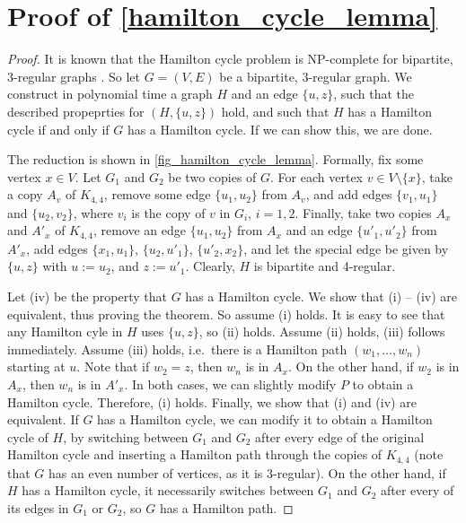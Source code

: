 \documentclass[runningheads]{llncs}
\numberwithin{equation}{section}
\newcommand{\set}[1]{\{ #1 \}}
\begin{document}
\section{Proof of \cref{hamilton_cycle_lemma}}

\label{appendix:hamilton_prime}
\hamiltonPrime*

\begin{proof}
It is known that the Hamilton cycle problem is NP-complete for bipartite, 3-regular graphs \cite{hamilton3regularBip}. So let $G = (V, E)$ be a bipartite, 3-regular graph. We construct in polynomial time a graph $H$ and an edge $\set{u,z}$, such that the described propeprties for $(H, \set{u,z})$ hold, and such that $H$ has a Hamilton cycle if and only if $G$ has a Hamilton cycle. If we can show this, we are done.

The reduction is shown in \cref{fig_hamilton_cycle_lemma}. Formally, fix some vertex $x \in V$. Let $G_1$ and $G_2$ be two copies of $G$. For each vertex $v \in V \setminus \set{x}$, take a copy $A_v$ of $K_{4,4}$, remove some edge $\set{u_1, u_2}$ from $A_v$, and add edges $\set{v_1,u_1}$ and $\set{u_2,v_2}$, where $v_i$ is the copy of $v$ in $G_i$, $i = 1,2$. Finally, take two copies $A_x$ and $A'_x$ of $K_{4,4}$, remove an edge $\set{u_1,u_2}$ from $A_x$ and an edge $\set{u'_1,u'_2}$ from $A'_x$, add edges $\set{x_1,u_1}$, $\set{u_2,u'_1}$, $\set{u'_2,x_2}$, and let the special edge be given by $\set{u, z}$ with $u := u_2$, and $z := u'_1$. Clearly, $H$ is bipartite and 4-regular.

Let (iv) be the property that $G$ has a Hamilton cycle. We show that (i) -- (iv) are equivalent, thus proving the theorem. So assume (i) holds. It is easy to see that any Hamilton cyle in $H$ uses $\set{u,z}$, so (ii) holds. Assume (ii) holds, (iii) follows immediately. Assume (iii) holds, i.e.\ there is a Hamilton path $(w_1, \dots, w_n)$ starting at $u$. Note that if $w_2 = z$, then $w_n$ is in $A_x$. On the other hand, if $w_2$ is in $A_x$, then $w_n$ is in $A'_x$. In both cases, we can slightly modify $P$ to obtain a Hamilton cycle. Therefore, (i) holds. Finally, we show that (i) and (iv) are equivalent. If $G$ has a Hamilton cycle, we can modify it to obtain a Hamilton cycle of $H$, by switching between $G_1$ and $G_2$ after every edge of the original Hamilton cycle and inserting a Hamilton path through the copies of $K_{4,4}$ (note that $G$ has an even number of vertices, as it is 3-regular). On the other hand, if $H$ has a Hamilton cycle, it necessarily switches between $G_1$ and $G_2$ after every of its edges in $G_1$ or $G_2$, so $G$ has a Hamilton path.
\end{proof}
\end{document}
